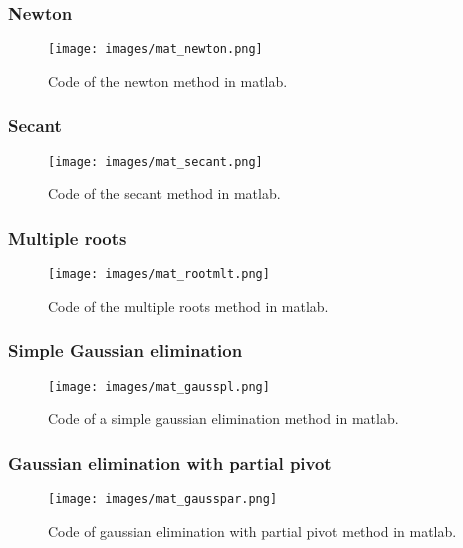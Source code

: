 \documentclass{article}
\begin{document}
\subsubsection{Newton}
\begin{figure}[ht]
\centering
\texttt{[image: images/mat\_newton.png]}
\caption{\label{fig:py_gausstot}Code of the newton method in matlab.}
\end{figure}
\FloatBarrier

\subsubsection{Secant}
\begin{figure}[ht]
\centering
\texttt{[image: images/mat\_secant.png]}
\caption{\label{fig:py_gausstot}Code of the secant method in matlab.}
\end{figure}
\FloatBarrier

\subsubsection{Multiple roots}
\begin{figure}[ht]
\centering
\texttt{[image: images/mat\_rootmlt.png]}
\caption{\label{fig:py_gausstot}Code of the multiple roots method in matlab.}
\end{figure}
\FloatBarrier

\subsubsection{Simple Gaussian elimination}
\begin{figure}[ht]
\centering
\texttt{[image: images/mat\_gausspl.png]}
\caption{\label{fig:py_gausstot}Code of a simple gaussian elimination method in matlab.}
\end{figure}
\FloatBarrier

\subsubsection{Gaussian elimination with partial pivot}
\begin{figure}[ht]
\centering
\texttt{[image: images/mat\_gausspar.png]}
\caption{\label{fig:py_gausstot}Code of gaussian elimination with partial pivot method in matlab.}
\end{figure}
\FloatBarrier
\end{document}
